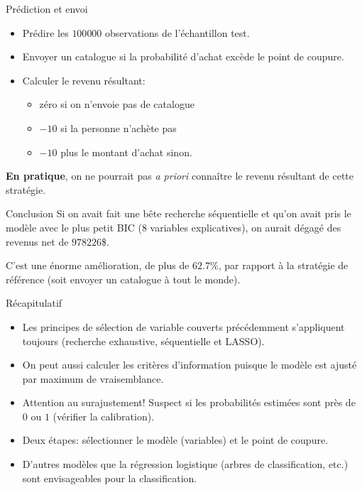 \documentclass[
  ignorenonframetext,
]{beamer}
\providecommand{\tightlist}{%
  \setlength{\itemsep}{0pt}\setlength{\parskip}{0pt}}\usepackage{longtable,booktabs,array}
\begin{document}
\begin{frame}{Prédiction et envoi}
\protect\hypertarget{pruxe9diction-et-envoi}{}
\begin{itemize}
\tightlist
\item
  Prédire les \(100 000\) observations de l'échantillon test.
\item
  Envoyer un catalogue si la probabilité d'achat excède le point de
  coupure.
\item
  Calculer le revenu résultant:

  \begin{itemize}
  \tightlist
  \item
    zéro si on n'envoie pas de catalogue
  \item
    \(-10\) si la personne n'achète pas
  \item
    \(-10\) plus le montant d'achat sinon.
  \end{itemize}
\end{itemize}

\textbf{En pratique}, on ne pourrait pas \emph{a priori} connaître le
revenu résultant de cette stratégie.
\end{frame}

\begin{frame}{Conclusion}
\protect\hypertarget{conclusion}{}
Si on avait fait une bête recherche séquentielle et qu'on avait pris le
modèle avec le plus petit BIC (8 variables explicatives), on aurait
dégagé des revenus net de \(978 226\)\$.

C'est une énorme amélioration, de plus de \(62.7\)\%, par rapport à la
stratégie de référence (soit envoyer un catalogue à tout le monde).
\end{frame}

\begin{frame}{Récapitulatif}
\protect\hypertarget{ruxe9capitulatif-2}{}
\begin{itemize}
\tightlist
\item
  Les principes de sélection de variable couverts précédemment
  s'appliquent toujours (recherche exhaustive, séquentielle et LASSO).
\item
  On peut aussi calculer les critères d'information puisque le modèle
  est ajusté par maximum de vraisemblance.
\item
  Attention au surajustement! Suspect si les probabilités estimées sont
  près de \(0\) ou \(1\) (vérifier la calibration).
\item
  Deux étapes: sélectionner le modèle (variables) et le point de
  coupure.
\item
  D'autres modèles que la régression logistique (arbres de
  classification, etc.) sont envisageables pour la classification.
\end{itemize}
\end{frame}
\end{document}
